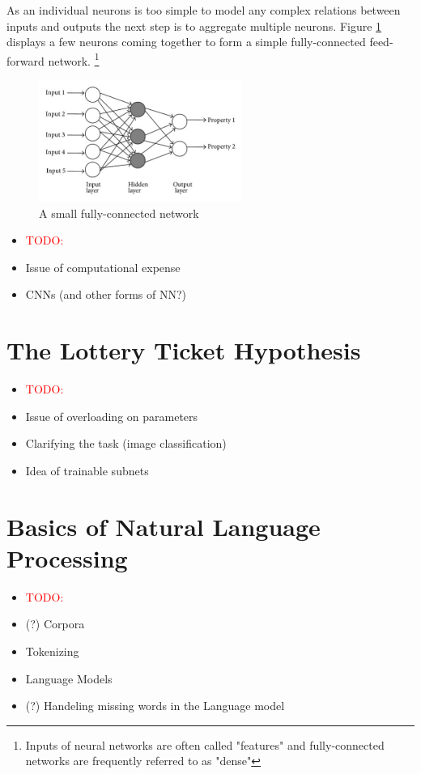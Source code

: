 As an individual neurons is too simple to model any complex relations between inputs
and outputs the next step is to aggregate multiple neurons. Figure \ref{fig:FFNetwork} displays a few neurons coming together to form a simple fully-connected feed-forward network.
\footnote{
	Inputs of neural networks are often called "features" and fully-connected networks are frequently referred to as "dense"	}
\begin{figure}
	\centering
		\includegraphics[height=150px]{gfx/Dense_FFNetwork.jpg}
		\caption{A small fully-connected network}
		\label{fig:FFNetwork}
\end{figure}

\begin{itemize}
	\item \textcolor{red}{TODO:}
	\item Issue of computational expense
	\item CNNs (and other forms of NN?)
\end{itemize}
	
\section{The Lottery Ticket Hypothesis}
\begin{itemize}
	\item \textcolor{red}{TODO:}
	\item Issue of overloading on parameters
	\item Clarifying the task (image classification)
	\item Idea of trainable subnets
\end{itemize}

\section{Basics of Natural Language Processing}
\begin{itemize}
	\item \textcolor{red}{TODO:}
	\item (?) Corpora
	\item Tokenizing
	\item Language Models
	\item (?) Handeling missing words in the Language model
\end{itemize}

